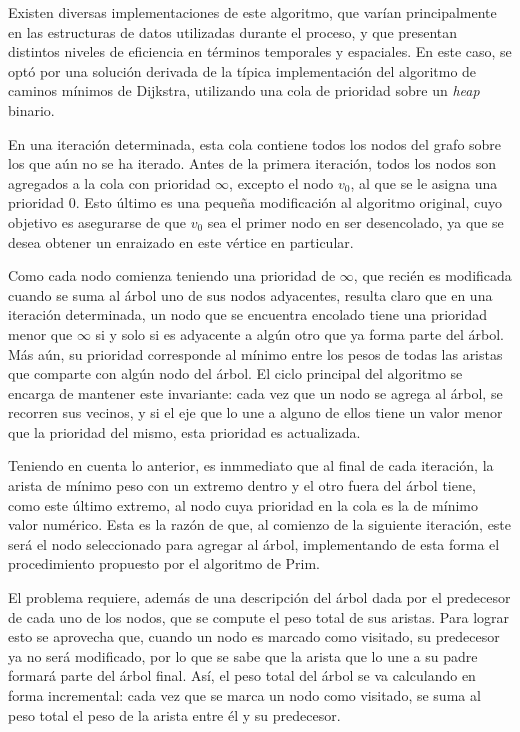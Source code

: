     Existen diversas implementaciones de este algoritmo, que varían
    principalmente en las estructuras de datos utilizadas durante el proceso,
    y que presentan distintos niveles de eficiencia en términos temporales y
    espaciales. En este caso, se optó por una solución derivada de la
    típica implementación del algoritmo de caminos mínimos de Dijkstra,
    utilizando una cola de prioridad sobre un \emph{heap} binario.

    En una iteración determinada, esta cola contiene todos los nodos del grafo
    sobre los que aún no se ha iterado. Antes de la primera iteración, todos
    los nodos son agregados a la cola con prioridad $\infty$, excepto el nodo
    $v_0$, al que se le asigna una prioridad $0$. Esto último es una pequeña
    modificación al algoritmo original, cuyo objetivo es asegurarse de
    que $v_0$ sea el primer nodo en ser desencolado, ya que se desea obtener
    un  enraizado en este vértice en particular.

    Como cada nodo comienza teniendo una prioridad de $\infty$, que recién
    es modificada cuando se suma al árbol uno de sus nodos adyacentes,
    resulta claro que en una iteración determinada, un nodo que se encuentra
    encolado tiene una prioridad menor que $\infty$ si y solo si es adyacente
    a algún otro que ya forma parte del árbol. Más aún, su prioridad
    corresponde al mínimo entre los pesos de todas las aristas que comparte
    con algún nodo del árbol. El ciclo principal del algoritmo se encarga de
    mantener este invariante: cada vez que un nodo se agrega al árbol, se
    recorren sus vecinos, y si el eje que lo une a alguno de ellos tiene un
    valor menor que la prioridad del mismo, esta prioridad es actualizada.

    Teniendo en cuenta lo anterior, es inmmediato que al final de cada
    iteración, la arista de mínimo peso con un extremo dentro y el otro fuera
    del árbol tiene, como este último extremo, al nodo cuya prioridad en la
    cola es la de mínimo valor numérico. Esta es la razón de que, al comienzo
    de la siguiente iteración, este será el nodo seleccionado para agregar al
    árbol, implementando de esta forma el procedimiento propuesto por el
    algoritmo de Prim.

    El problema requiere, además de una descripción del árbol dada por el
    predecesor de cada uno de los nodos, que se compute el peso total de sus
    aristas. Para lograr esto se aprovecha que, cuando un nodo es marcado como
    visitado, su predecesor ya no será modificado, por lo que se sabe que
    la arista que lo une a su padre formará parte del árbol final. Así, el
    peso total del árbol se va calculando en forma incremental: cada
    vez que se marca un nodo como visitado, se suma al peso total el peso de
    la arista entre él y su predecesor.

